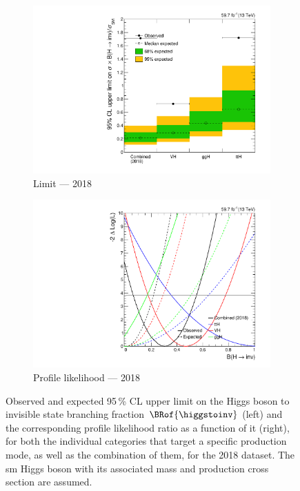 \begin{figure}[htbp]
    \centering
    \begin{subfigure}[t]{0.45\textwidth}
        \includegraphics[width=\textwidth]{figures/limits/per_year/limit_2018_comb.pdf}
        \caption{Limit --- 2018}
    \end{subfigure}
    \hspace{0.05\textwidth}
    \begin{subfigure}[t]{0.45\textwidth}
        \includegraphics[width=\textwidth]{figures/likelihood_scan/profile_likelihood_scan_2018.pdf}
        \caption{Profile likelihood --- 2018}
    \end{subfigure}
    \caption[Observed and expected 95\,\% CL upper limit on the Higgs boson to invisible state branching fraction $\BRof{\higgstoinv}$ and the corresponding profile likelihood ratio as a function of it, for both the individual categories that target a specific production mode, as well as the combination of them, for the 2018 dataset]{Observed and expected 95\,\% CL upper limit on the Higgs boson to invisible state branching fraction $\BRof{\higgstoinv}$ (left) and the corresponding profile likelihood ratio as a function of it (right), for both the individual categories that target a specific production mode, as well as the combination of them, for the 2018 dataset. The \acrlong{sm} Higgs boson with its associated mass and production cross section are assumed.}
    \label{fig:htoinv_limit_likelihood_2018}
\end{figure}

